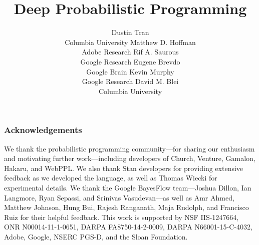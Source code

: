 \documentclass{article} %
\title{Deep Probabilistic Programming}
\author{%
Dustin Tran \\
Columbia University
\And
Matthew D. Hoffman \hspace{-0.7em} \\
Adobe Research
\And
Rif A. Saurous \hspace{8.65em} \\
Google Research
\AND
Eugene Brevdo \\
Google Brain
\And
Kevin Murphy \\
Google Research
\And
David M. Blei \\
Columbia University
}
\begin{document}
\maketitle










\subsubsection*{Acknowledgements}
We thank the probabilistic programming community---for sharing our
enthusiasm and motivating further work---including developers of
Church, Venture, Gamalon, Hakaru, and WebPPL.  We also thank Stan developers
for providing extensive feedback as we
developed the language, as well as Thomas Wiecki for experimental
details.
We thank the Google BayesFlow team---Joshua Dillon, Ian Langmore,
Ryan Sepassi, and Srinivas Vasudevan---as well as Amr Ahmed, Matthew
Johnson, Hung Bui, Rajesh Ranganath, Maja Rudolph, and Francisco Ruiz
for their helpful feedback.
This work is supported by NSF IIS-1247664, ONR N00014-11-1-0651,
DARPA FA8750-14-2-0009, DARPA N66001-15-C-4032, Adobe, Google, NSERC
PGS-D, and the Sloan Foundation.



\clearpage

\appendix

\end{document}
